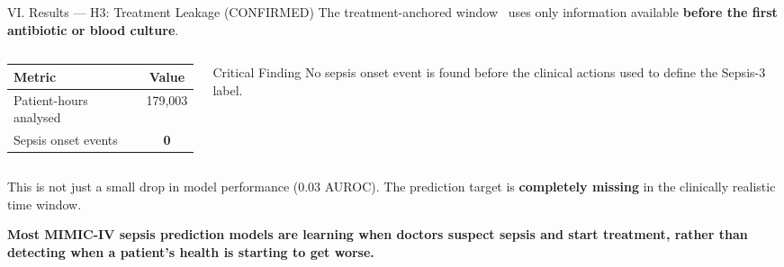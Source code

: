 \documentclass[aspectratio=169,10pt]{beamer}
\newcommand{\tablestyle}{%
  \renewcommand{\arraystretch}{1.2}%
  \small%
}
\begin{document}
\begin{frame}{VI. Results --- H3: Treatment Leakage {\small\color{BabyMint!60!green}(CONFIRMED)}}
The treatment-anchored window~\cite{kamran2024evaluation} uses only information available \textbf{before the first antibiotic or blood culture}.

\vspace{6pt}
\begin{columns}[c]
\begin{column}{0.40\textwidth}
\begin{center}
\tablestyle
\begin{tabular}{lc}
\toprule
\textbf{Metric} & \textbf{Value} \\
\midrule
Patient-hours analysed & 179,003 \\
Sepsis onset events    & \textbf{0} \\
\bottomrule
\end{tabular}
\end{center}
\end{column}
\begin{column}{0.58\textwidth}
\begin{alertblock}{Critical Finding}
  No sepsis onset event is found before the clinical actions used to define the Sepsis-3 label.
\end{alertblock}
\end{column}
\end{columns}

\vspace{6pt}
This is not just a small drop in model performance (0.03 AUROC). The prediction target is \textbf{completely missing} in the clinically realistic time window.

\vspace{4pt}
\textbf{Most MIMIC-IV sepsis prediction models are learning when doctors suspect sepsis and start treatment, rather than detecting when a patient's health is starting to get worse.}
\end{frame}
\end{document}

